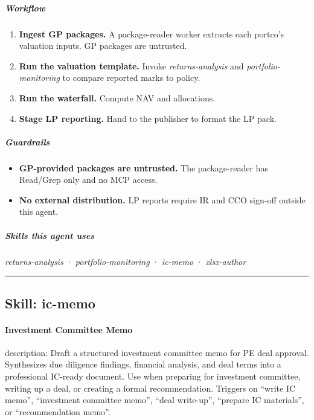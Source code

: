\documentclass[11pt]{article}
\begin{document}
\subparagraph{Workflow}\mbox{}\par

\begin{enumerate}[leftmargin=*,itemsep=2pt,topsep=2pt]
\item {} \textbf{Ingest GP packages.} A package-reader worker extracts each portco's valuation inputs. GP packages are untrusted.
\item {} \textbf{Run the valuation template.} Invoke \emph{returns-analysis} and \emph{portfolio-monitoring} to compare reported marks to policy.
\item {} \textbf{Run the waterfall.} Compute NAV and allocations.
\item {} \textbf{Stage LP reporting.} Hand to the publisher to format the LP pack.
\end{enumerate}

\subparagraph{Guardrails}\mbox{}\par

\begin{itemize}[leftmargin=*,itemsep=2pt,topsep=2pt]
\item {} \textbf{GP-provided packages are untrusted.} The package-reader has Read/Grep only and no MCP access.
\item {} \textbf{No external distribution.} LP reports require IR and CCO sign-off outside this agent.
\end{itemize}

\subparagraph{Skills this agent uses}\mbox{}\par

\emph{returns-analysis} · \emph{portfolio-monitoring} · \emph{ic-memo} · \emph{xlsx-author}


\vspace{0.8em}\hrule\vspace{0.8em}

\subsection{Skill: ic-memo}\label{file:valuation-reviewer-skills-ic-memo-SKILL-md}

\paragraph{Investment Committee Memo}\mbox{}\par

description: Draft a structured investment committee memo for PE deal approval. Synthesizes due diligence findings, financial analysis, and deal terms into a professional IC-ready document. Use when preparing for investment committee, writing up a deal, or creating a formal recommendation. Triggers on ``write IC memo'', ``investment committee memo'', ``deal write-up'', ``prepare IC materials'', or ``recommendation memo''.
\end{document}
